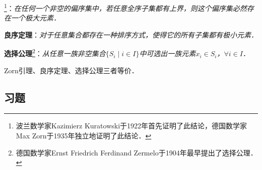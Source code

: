 \documentclass[a4paper,fontset=windows]{ctexbook}
\theoremstyle{definition}
\def\note{\noindent\raisebox{10pt}{\dbend}\hspace{7pt}}
\begin{document}
\note {\bf Zorn引理}\footnote{波兰数学家Kazimierz Kuratowski于1922年首先证明了此结论，德国数学家Max Zorn于1935年独立地证明了此结论．}：{\em 在任何一个非空的偏序集中，若任意全序子集都有上界，则这个偏序集必然存在一个极大元素．}

{\bf 良序定理}：{\em 对于任意集合都存在一种排序方式，使得它的所有子集都有极小元素．}

{\bf 选择公理}\footnote{德国数学家Ernst Friedrich Ferdinand Zermelo于1904年最早提出了选择公理．}：{\em 从任意一族非空集合$\{S_i\mid i\in I\}$中可选出一族元素$x_i\in S_i$，$\forall i\in I$．}

Zorn引理、良序定理、选择公理三者等价．

\subsection*{习题}
\end{document}
